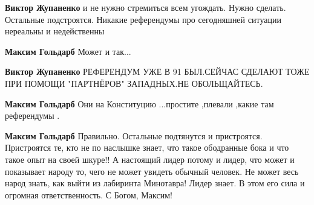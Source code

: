 \begin{itemize}
\begin{itemize}
\textbf{Виктор Жупаненко} и не нужно стремиться всем угождать. Нужно сделать. Остальные подстроятся. Никакие референдумы про сегодняшней ситуации нереальны и недейственны

 
\textbf{Максим Гольдарб} Может и так...

 
\textbf{Виктор Жупаненко} РЕФЕРЕНДУМ УЖЕ В 91 БЫЛ.СЕЙЧАС СДЕЛАЮТ ТОЖЕ ПРИ ПОМОЩИ "ПАРТНЁРОВ" ЗАПАДНЫХ.НЕ ОБОЛЬЩАЙТЕСЬ.

 
\textbf{Максим Гольдарб} Они на Конституцию ...простите ,плевали ,какие там референдумы .

 
\textbf{Максим Гольдарб} Правильно. Остальные подтянутся и пристроятся.
Пристроятся те, кто не по наслышке знает, что такое ободранные бока и что такое
опыт на своей шкуре!! А настоящий лидер потому и лидер, что может и показывает
народу то, чего не может увидеть обычный человек. Не может весь народ знать,
как выйти из лабиринта Минотавра! Лидер знает. В этом его сила и огромная
ответственность. С Богом, Максим!
\end{itemize}

 

\end{itemize}
